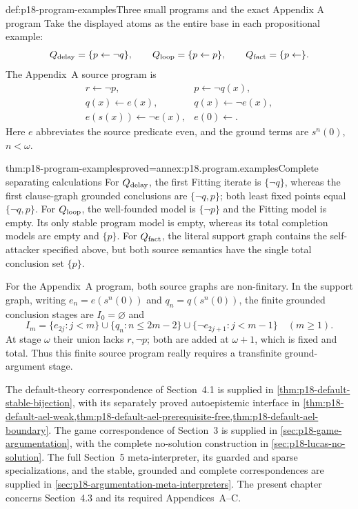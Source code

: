 \begin{hbdefinition}{def:p18-program-examples}{Three small programs and the exact Appendix A program}
Take the displayed atoms as the entire
base in each propositional example:
\[
 Q_{\rm delay}=\{p\leftarrow\neg q\},\qquad
 Q_{\rm loop}=\{p\leftarrow p\},\qquad
 Q_{\rm fact}=\{p\leftarrow\}.
\]
The Appendix~A source program is
\[
\begin{array}{ll}
 r\leftarrow\neg p,&p\leftarrow\neg q(x),\\
 q(x)\leftarrow e(x),&q(x)\leftarrow\neg e(x),\\
 e(s(x))\leftarrow\neg e(x),&e(0)\leftarrow.
\end{array}
\]
Here \(e\) abbreviates the source predicate
\(\mathrm{even}\), and the ground terms
are \(s^n(0)\), \(n<\omega\).
\end{hbdefinition}

\begin{hbtheorem}{thm:p18-program-examples}{proved=annex:p18.program.examples}{Complete separating calculations}
For \(Q_{\rm delay}\), the first Fitting
iterate is \(\{\neg q\}\), whereas the
first clause-graph grounded conclusions
are \(\{\neg q,p\}\); both least fixed
points equal \(\{\neg q,p\}\).
For \(Q_{\rm loop}\), the well-founded
model is \(\{\neg p\}\) and the Fitting
model is empty. Its only stable program
model is empty, whereas its total
completion models are empty and \(\{p\}\).
For \(Q_{\rm fact}\), the literal
support graph contains the self-attacker
specified above, but both source
semantics have the single total
conclusion set \(\{p\}\).

For the Appendix~A program, both source
graphs are non-finitary. In the support
graph, writing \(e_n=e(s^n(0))\) and
\(q_n=q(s^n(0))\), the finite grounded
conclusion stages are \(I_0=\varnothing\) and
\[
 I_m=\{e_{2j}:j<m\}\cup\{q_n:n\leq2m-2\}
               \cup\{\neg e_{2j+1}:j<m-1\}\quad(m\geq1).
\]
At stage \(\omega\) their union lacks
\(r,\neg p\); both are added at
\(\omega+1\), which is fixed and total.
Thus this finite source program really
requires a transfinite ground-argument
stage.
\end{hbtheorem}

The default-theory correspondence of Section~4.1 is supplied in
\cref{thm:p18-default-stable-bijection}, with its separately proved
autoepistemic interface in
\cref{thm:p18-default-ael-weak,thm:p18-default-ael-prerequisite-free,thm:p18-default-ael-boundary}.
The game correspondence of Section~3 is supplied in
\cref{sec:p18-game-argumentation}, with the complete no-solution
construction in \cref{sec:p18-lucas-no-solution}.
The full Section~5 meta-interpreter, its guarded and sparse
specializations, and the stable, grounded and complete correspondences
are supplied in \cref{sec:p18-argumentation-meta-interpreters}. The present
chapter concerns Section~4.3 and its
required Appendices~A--C.
